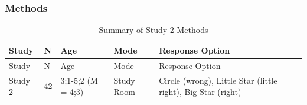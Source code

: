 \documentclass[floatsintext,man]{apa6}
\theoremstyle{definition}
\theoremstyle{definition}
\theoremstyle{definition}
\theoremstyle{remark}
\begin{document}
\subsubsection{Methods}\label{methods-1}

\begin{longtable}[]{@{}lllll@{}}
\caption{\label{tab:study2info} Summary of Study 2 Methods}\tabularnewline
\toprule
\begin{minipage}[b]{0.11\columnwidth}\raggedright\strut
Study\strut
\end{minipage} & \begin{minipage}[b]{0.04\columnwidth}\raggedright\strut
N\strut
\end{minipage} & \begin{minipage}[b]{0.21\columnwidth}\raggedright\strut
Age\strut
\end{minipage} & \begin{minipage}[b]{0.17\columnwidth}\raggedright\strut
Mode\strut
\end{minipage} & \begin{minipage}[b]{0.32\columnwidth}\raggedright\strut
Response Option\strut
\end{minipage}\tabularnewline
\midrule
\endfirsthead
\toprule
\begin{minipage}[b]{0.11\columnwidth}\raggedright\strut
Study\strut
\end{minipage} & \begin{minipage}[b]{0.04\columnwidth}\raggedright\strut
N\strut
\end{minipage} & \begin{minipage}[b]{0.21\columnwidth}\raggedright\strut
Age\strut
\end{minipage} & \begin{minipage}[b]{0.17\columnwidth}\raggedright\strut
Mode\strut
\end{minipage} & \begin{minipage}[b]{0.32\columnwidth}\raggedright\strut
Response Option\strut
\end{minipage}\tabularnewline
\midrule
\endhead
\begin{minipage}[t]{0.11\columnwidth}\raggedright\strut
Study 2\strut
\end{minipage} & \begin{minipage}[t]{0.04\columnwidth}\raggedright\strut
42\strut
\end{minipage} & \begin{minipage}[t]{0.21\columnwidth}\raggedright\strut
3;1-5;2 (M = 4;3)\strut
\end{minipage} & \begin{minipage}[t]{0.17\columnwidth}\raggedright\strut
Study Room\strut
\end{minipage} & \begin{minipage}[t]{0.32\columnwidth}\raggedright\strut
Circle (wrong), Little Star (little right), Big Star (right)\strut
\end{minipage}\tabularnewline
\bottomrule
\end{longtable}
\end{document}
